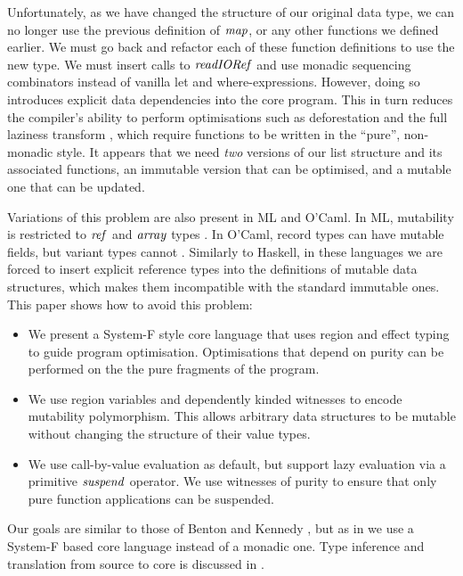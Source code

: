 Unfortunately, as we have changed the structure of our original data type, we can no longer use the previous definition of $\operatorname{\mathit{map}}$, or any other functions we defined earlier. We must go back and refactor each of these function definitions to use the new type. We must insert calls to $\operatorname{\mathit{readIORef}}$ and use monadic sequencing combinators instead of vanilla let and where-expressions. However, doing so introduces explicit data dependencies into the core program. This in turn reduces the compiler's ability to perform optimisations such as deforestation and the full laziness transform \cite{santos:compilation}, which require functions to be written in the ``pure'', non-monadic style. It appears that we need \emph{two} versions of our list structure and its associated functions, an immutable version that can be optimised, and a mutable one that can be updated. 

Variations of this problem are also present in ML and O'Caml. In ML, mutability is restricted to $\operatorname{\mathit{ref}}$ and $\operatorname{\mathit{array}}$ types \cite{macqueen:sml}. In O'Caml, record types can have mutable fields, but variant types cannot \cite{leroy:ocaml-3.11}. Similarly to Haskell, in these languages we are forced to insert explicit reference types into the definitions of mutable data structures, which makes them incompatible with the standard immutable ones. This paper shows how to avoid this problem:


\begin{itemize}
\item	We present a System-F style core language that uses region and effect typing to guide program optimisation. Optimisations that depend on purity can be performed on the the pure fragments of the program. 
\medskip

\item	We use region variables and dependently kinded witnesses to encode mutability polymorphism. This allows arbitrary data structures to be mutable without changing the structure of their value types.
\medskip

\item	We use call-by-value evaluation as default, but support lazy evaluation via a primitive $\operatorname{\mathit{suspend}}$ operator. We use witnesses of purity to ensure that only pure function applications can be suspended.
\end{itemize}

Our goals are similar to those of Benton and Kennedy \cite{benton:monads-effects-transformations}, but as in \cite{sulzmann:system-Fc} we use a System-F based core language instead of a monadic one. Type inference and translation from source to core is discussed in \cite{lippmeier:impure-world}.




